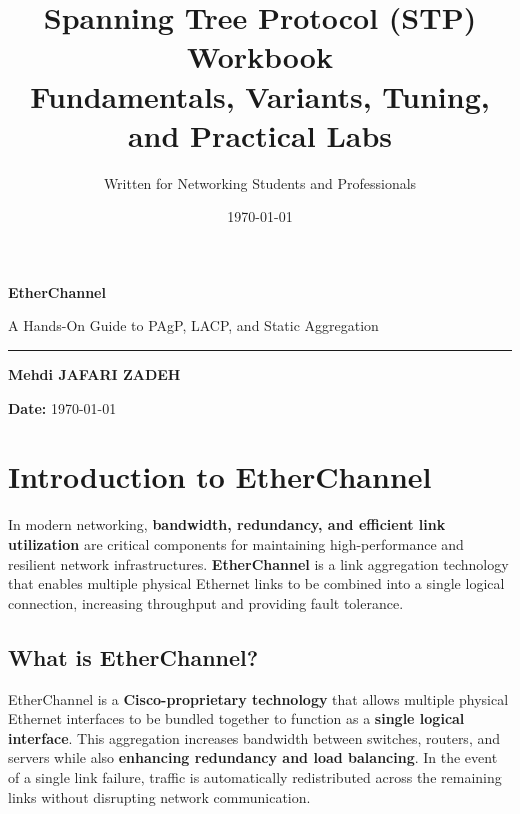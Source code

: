 \documentclass[a4paper]{article}
\title{\Huge \textbf{Spanning Tree Protocol (STP) Workbook}\\
       \Large Fundamentals, Variants, Tuning, and Practical Labs}
\author{\Large Written for Networking Students and Professionals}
\date{\today}
\begin{document}
\begin{titlepage}

	\centering
	\vspace*{4cm}
	{\Huge \textbf{EtherChannel}\par}
	\vspace{0.8cm}
	{\Large A Hands-On Guide to PAgP, LACP, and Static Aggregation\par}
	\vspace{0.3cm}
	\rule{0.9\textwidth}{1pt}

	\vspace{0.6cm}
	{\large \textbf{Mehdi JAFARI ZADEH}}\par
	\vspace{0.3cm}
	\centering
	\vspace*{4cm}

	\vfill
	\textbf{Date:} \today
	\vspace{2cm}
\end{titlepage}

\tableofcontents
\newpage
\section{Introduction to EtherChannel}
In modern networking, \textbf{bandwidth, redundancy, and efficient link utilization} are critical components for maintaining high-performance and resilient network infrastructures. \textbf{EtherChannel} is a link aggregation technology that enables multiple physical Ethernet links to be combined into a single logical connection, increasing throughput and providing fault tolerance.

\subsection{What is EtherChannel?}
EtherChannel is a \textbf{Cisco-proprietary technology} that allows multiple physical Ethernet interfaces to be bundled together to function as a \textbf{single logical interface}. This aggregation increases bandwidth between switches, routers, and servers while also \textbf{enhancing redundancy and load balancing}. In the event of a single link failure, traffic is automatically redistributed across the remaining links without disrupting network communication.
\end{document}
